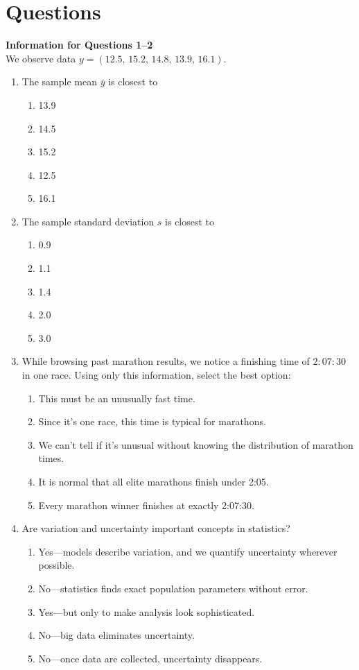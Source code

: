 \documentclass{article}
\begin{document}
\section*{Questions}
\textbf{Information for Questions 1--2}\\
We observe data $y=(12.5,\,15.2,\,14.8,\,13.9,\,16.1)$.

\begin{enumerate}
\item The sample mean $\bar y$ is closest to
    \begin{enumerate}[label=\Alph*.]
        \item 13.9
        \item 14.5
        \item 15.2
        \item 12.5
        \item 16.1
    \end{enumerate}
\item The sample standard deviation $s$ is closest to
    \begin{enumerate}[label=\Alph*.]
        \item 0.9
        \item 1.1
        \item 1.4
        \item 2.0
        \item 3.0
    \end{enumerate}
\item While browsing past marathon results, we notice a finishing time of $2{:}07{:}30$ in one race. Using only this information, select the best option:
    \begin{enumerate}[label=\Alph*.]
        \item This must be an unusually fast time.
        \item Since it’s one race, this time is typical for marathons.
        \item We can’t tell if it’s unusual without knowing the distribution of marathon times.
        \item It is normal that all elite marathons finish under 2:05.
        \item Every marathon winner finishes at exactly 2:07{:}30.
    \end{enumerate}
\item Are variation and uncertainty important concepts in statistics?
    \begin{enumerate}[label=\Alph*.]
        \item Yes—models describe variation, and we quantify uncertainty wherever possible.
        \item No—statistics finds exact population parameters without error.
        \item Yes—but only to make analysis look sophisticated.
        \item No—big data eliminates uncertainty.
        \item No—once data are collected, uncertainty disappears.
    \end{enumerate}


\end{enumerate}
\end{document}
